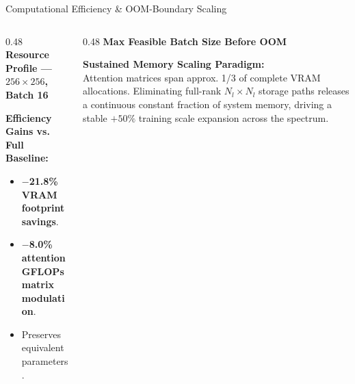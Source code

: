 \documentclass[aspectratio=169]{beamer}
\begin{document}
\begin{frame}{Computational Efficiency \& OOM-Boundary Scaling}

\begin{columns}[T]
\begin{column}{0.48\textwidth}
\centering
\textbf{\color{utecblue}Resource Profile — $256{\times}256$, Batch 16}
\vskip 0.15cm

\vskip 0.25cm
\raggedright
\textbf{\color{utecblue}Efficiency Gains vs. Full Baseline:}
\vskip 0.05cm
\begin{itemize}
  \item \textbf{$-$21.8\% VRAM footprint savings}.
  \item \textbf{$-$8.0\% attention GFLOPs matrix modulation}.
  \item Preserves equivalent parameters.
\end{itemize}
\end{column}

\begin{column}{0.48\textwidth}
\centering
\textbf{\color{utecblue}Max Feasible Batch Size Before OOM}
\vskip 0.15cm

\vskip 0.25cm
\raggedright
\textbf{\color{utecblue}Sustained Memory Scaling Paradigm:}\\
\footnotesize
Attention matrices span approx. 1/3 of complete VRAM allocations. Eliminating full-rank $N_l \times N_l$ storage paths releases a continuous constant fraction of system memory, driving a stable $+50\%$ training scale expansion across the spectrum.
\end{column}
\end{columns}

\end{frame}
\end{document}

